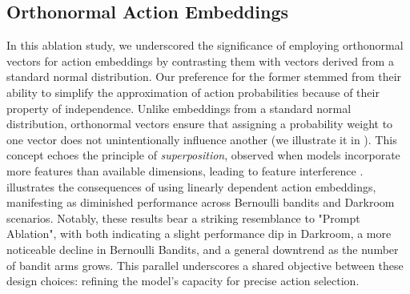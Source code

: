 \documentclass{article}
\theoremstyle{plain}
\theoremstyle{definition}
\theoremstyle{remark}
\begin{document}
\subsection{Orthonormal Action Embeddings}
In this ablation study, we underscored the significance of employing orthonormal vectors for action embeddings by contrasting them with vectors derived from a standard normal distribution. Our preference for the former stemmed from their ability to simplify the approximation of action probabilities because of their property of independence. Unlike embeddings from a standard normal distribution, orthonormal vectors ensure that assigning a probability weight to one vector does not unintentionally influence another (we illustrate it in ). This concept echoes the principle of \textit{superposition}, observed when models incorporate more features than available dimensions, leading to feature interference \cite{elhage2022superposition}.
 illustrates the consequences of using linearly dependent action embeddings, manifesting as diminished performance across Bernoulli bandits and Darkroom scenarios. Notably, these results bear a striking resemblance to "Prompt Ablation", with both indicating a slight performance dip in Darkroom, a more noticeable decline in Bernoulli Bandits, and a general downtrend as the number of bandit arms grows. This parallel underscores a shared objective between these design choices: refining the model's capacity for precise action selection.
\end{document}
